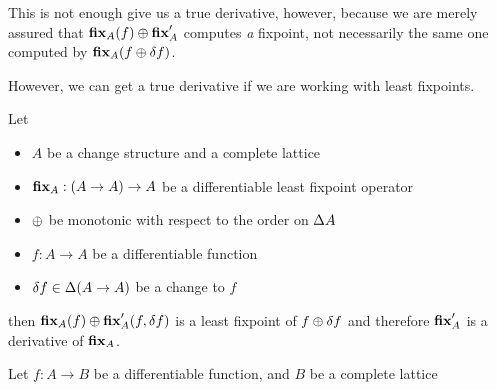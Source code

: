 This is not enough give us a true derivative, however, because we are merely
assured that $\textbf{fix}_A(f) \oplus \textbf{fix}_A'$ computes \emph{a} fixpoint, not necessarily
the same one computed by $\textbf{fix}_A{(f \oplus \delta f)}$.

However, we can get a true derivative if we are working with least fixpoints.

\begin{thm}
\label{thm:leastFixpointDiff}
  Let 
  \begin{itemize}
    \item $A$ be a change structure and a complete lattice
    \item$\textbf{fix}_A : (A \rightarrow A) \rightarrow A$ be a differentiable
      least fixpoint operator
    \item $\oplus$ be monotonic with respect to the order on $\Delta A$
    \item $f: A \rightarrow A$ be a differentiable function
    \item $\delta f \in \Delta (A \rightarrow A)$ be a change to $f$
  \end{itemize}

  then $\textbf{fix}_A(f) \oplus \textbf{fix}_A'(f, \delta f)$ is a least
  fixpoint of $f \oplus \delta f$ and therefore $\textbf{fix}_A'$ is a derivative of $\textbf{fix}_A$.
\end{thm}

\begin{prop}
  Let $f: A \rightarrow B$ be a differentiable function, and $B$ be a complete lattice
\end{prop}

